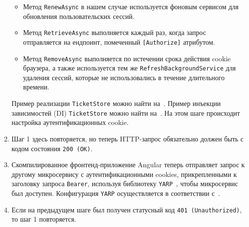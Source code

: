 \begin{enumerate}
\begin{itemize}
        \item Метод \texttt{RenewAsync} в нашем случае используется фоновым сервисом для обновления пользовательских сессий.
        \item Метод \texttt{RetrieveAsync} выполняется каждый раз, когда запрос отправляется на ендпоинт, помеченный \texttt{[Authorize]} атрибутом.
        \item Метод \texttt{RemoveAsync} выполняется по истечении срока действия cookie браузера, а также используется
        тем же \texttt{RefreshBackgroundService} для удаления сессий, которые не использовались в течение длительного времени.
    \end{itemize}
    Пример реализации \texttt{TicketStore} можно найти на~\cite{ticketStore_2023}.
    Пример инъекции зависимостей (DI) \texttt{TicketStore} можно найти на~\cite{ticketStoreDI_2023}.
    На этом шаге происходит настройка аутентификационных cookie.
    \item Шаг 1 здесь повторяется, но теперь HTTP-запрос обязательно должен быть с кодом состояния \texttt{200 (OK)}.
    \item Скомпилированное фронтенд-приложение Angular теперь отправляет запрос к другому микросервису с аутентификационными cookies,
    прикрепленными к заголовку запроса \texttt{Bearer}, используя библиотеку \texttt{YARP}~\cite{microsoftYarp2021}, чтобы микросервис был доступен.
    Конфигурация \texttt{YARP} осуществляется в соответствии с~\cite{yarpDI_2023,yarpSectionAppSettings_2023}.
    \item Если на предыдущем шаге был получен статусный код \texttt{401 (Unauthorized)}, то шаг 1 повторяется.
\end{enumerate}